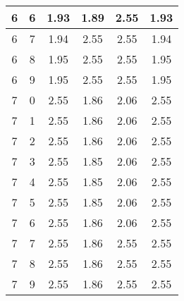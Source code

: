 \begin{longtable}{|c|c||c||c|c||c|}
	6 & 6 & 1.93 & 1.89 & 2.55 & 1.93 \\ \hline
	6 & 7 & 1.94 & 2.55 & 2.55 & 1.94 \\ \hline
	6 & 8 & 1.95 & 2.55 & 2.55 & 1.95 \\ \hline
	6 & 9 & 1.95 & 2.55 & 2.55 & 1.95 \\ \hline
	7 & 0 & 2.55 & 1.86 & 2.06 & 2.55 \\ \hline
	7 & 1 & 2.55 & 1.86 & 2.06 & 2.55 \\ \hline
	7 & 2 & 2.55 & 1.86 & 2.06 & 2.55 \\ \hline
	7 & 3 & 2.55 & 1.85 & 2.06 & 2.55 \\ \hline
	7 & 4 & 2.55 & 1.85 & 2.06 & 2.55 \\ \hline
	7 & 5 & 2.55 & 1.85 & 2.06 & 2.55 \\ \hline
	7 & 6 & 2.55 & 1.86 & 2.06 & 2.55 \\ \hline
	7 & 7 & 2.55 & 1.86 & 2.55 & 2.55 \\ \hline
	7 & 8 & 2.55 & 1.86 & 2.55 & 2.55 \\ \hline
	7 & 9 & 2.55 & 1.86 & 2.55 & 2.55 \\ \hline
\end{longtable}
\clearpage{}

